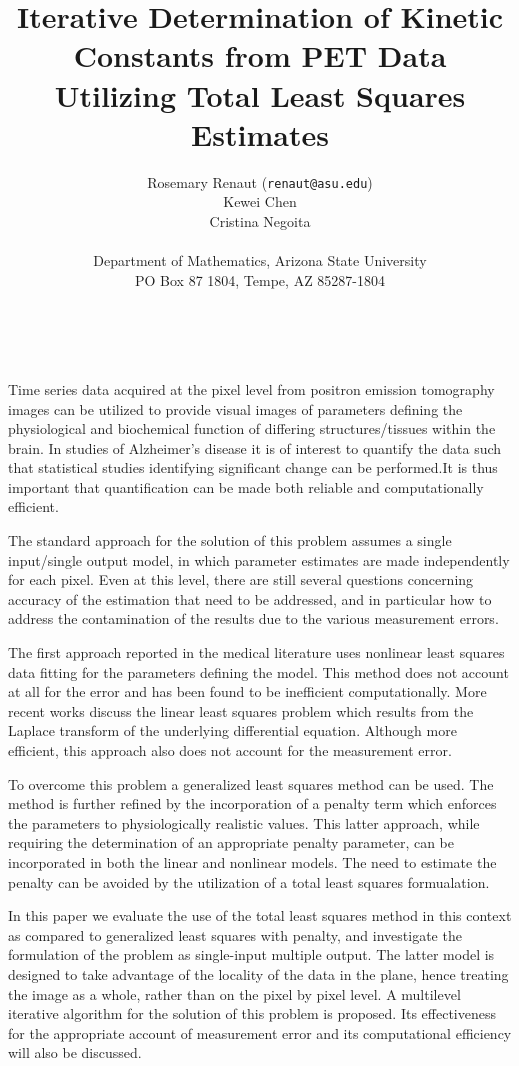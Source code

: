 \documentclass[11pt]{article}
\date{ ~ \hspace{-4mm}}
\title{Iterative Determination of Kinetic Constants from PET Data Utilizing Total Least Squares Estimates  }
\author{Rosemary Renaut ({\tt  renaut@asu.edu}) \\ Kewei Chen \\ Cristina Negoita \\ \\ Department of Mathematics, Arizona State University \\ PO Box 87 1804, Tempe, AZ 85287-1804}
\begin{document}
\maketitle
\thispagestyle{empty}





 



Time series data acquired at the pixel level from positron
emission tomography images can be utilized to provide
visual images of parameters defining the physiological and
biochemical function of differing structures/tissues within
the brain. In studies of Alzheimer's disease it is of
interest to quantify the data such that statistical studies
identifying significant change can be performed.It is thus
important that quantification can be made both reliable and
computationally efficient.

The standard approach for the
solution of this problem assumes a single input/single
output model, in which parameter estimates are made
independently for each pixel. Even at this level, there are
still several questions concerning accuracy of the
estimation that need to be addressed, and in particular how
to address the contamination of the results due to the
various measurement errors.

The first approach reported in
the medical literature uses nonlinear least squares data
fitting for the parameters defining the model. This method
does not account at all for the error and has been found to
be inefficient computationally. More recent works discuss
the linear least squares problem which results from the
Laplace transform of the underlying differential equation.
Although more efficient, this approach also does not
account for the measurement error.

To overcome this problem
a generalized least squares method can be used. The method
is further refined by the incorporation of a penalty term
which enforces the parameters to physiologically realistic
values. This latter approach, while requiring the
determination of an appropriate penalty parameter, can be
incorporated in both the linear and nonlinear models. The
need to estimate the penalty can be avoided by the
utilization of a total least squares formualation.

In this
paper we evaluate the use of the total least squares method
in this context as compared to generalized least squares
with penalty, and investigate the formulation of the
problem as single-input multiple output. The latter model
is designed to take advantage of the locality of the data
in the plane, hence treating the image as a whole, rather
than on the pixel by pixel level. A multilevel iterative
algorithm for the solution of this problem is proposed. Its
effectiveness for the appropriate account of measurement
error and its computational efficiency will also be
discussed.
\end{document}
